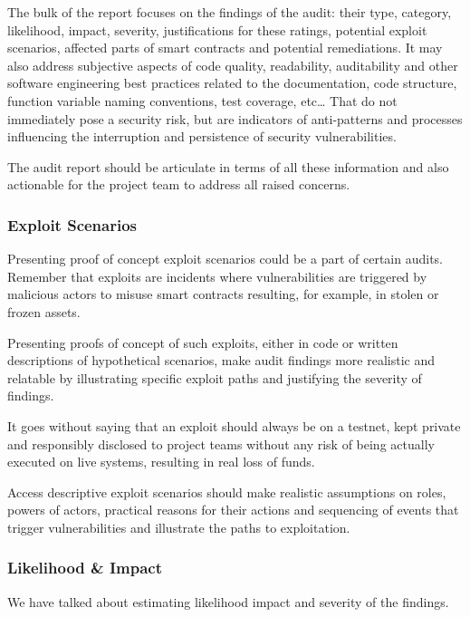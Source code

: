 The bulk of the report focuses on the findings of the audit: their type,
category, likelihood, impact, severity, justifications for these
ratings, potential exploit scenarios, affected parts of smart contracts
and potential remediations. It may also address subjective aspects of
code quality, readability, auditability and other software engineering
best practices related to the documentation, code structure, function
variable naming conventions, test coverage, etc\ldots{} That do not
immediately pose a security risk, but are indicators of anti-patterns
and processes influencing the interruption and persistence of security
vulnerabilities.

The audit report should be articulate in terms of all these information
and also actionable for the project team to address all raised concerns.

\subsubsection{Exploit Scenarios}\label{exploit-scenarios}

Presenting proof of concept exploit scenarios could be a part of certain
audits. Remember that exploits are incidents where vulnerabilities are
triggered by malicious actors to misuse smart contracts resulting, for
example, in stolen or frozen assets.

Presenting proofs of concept of such exploits, either in code or written
descriptions of hypothetical scenarios, make audit findings more
realistic and relatable by illustrating specific exploit paths and
justifying the severity of findings.

It goes without saying that an exploit should always be on a testnet,
kept private and responsibly disclosed to project teams without any risk
of being actually executed on live systems, resulting in real loss of
funds.

Access descriptive exploit scenarios should make realistic assumptions
on roles, powers of actors, practical reasons for their actions and
sequencing of events that trigger vulnerabilities and illustrate the
paths to exploitation.

\subsubsection{Likelihood \& Impact}\label{likelihood-impact}

We have talked about estimating likelihood impact and severity of the
findings.

